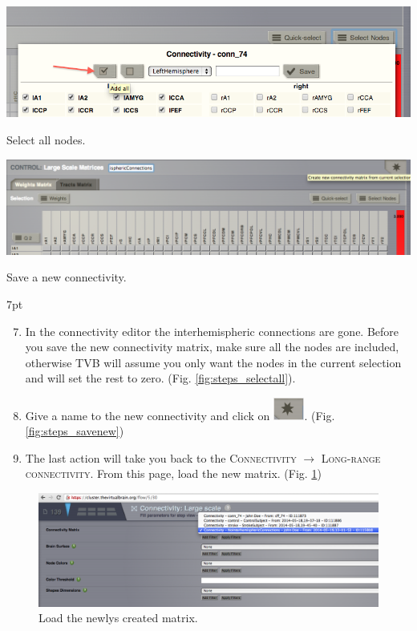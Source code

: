 \documentclass{tufte-handout}
\newenvironment{formal}{%
  \def\FrameCommand{%
    \hspace{1pt}%
    {\color{DarkBlue}\vrule width 2pt}%
    {\color{formalshade}\vrule width 4pt}%
    \colorbox{formalshade}%
  }%
  \MakeFramed{\advance\hsize-\width\FrameRestore}%
  \noindent\hspace{-4.55pt}%
  \begin{adjustwidth}{}{7pt}%
  \vspace{2pt}\vspace{2pt}%
}
{%
  \vspace{2pt}\end{adjustwidth}\endMakeFramed%
}
\begin{document}
\begin{marginfigure}%
  \includegraphics[width=\linewidth]{Handout_UI_ModellingStructuralLesions_SelectAllNodes}
    \caption{Select all nodes.}
  \label{fig:steps_selectall}
  \end{marginfigure}
  \begin{marginfigure}
 \includegraphics[width=\linewidth]{Handout_UI_ModellingStructuralLesions_SaveNewMatrix}
  \caption{Save a new connectivity.}
  \label{fig:steps_savenew}
\end{marginfigure}

\begin{formal}
  \begin{enumerate}[resume]
  \setcounter{enumi}{6}
    \item In the connectivity editor the interhemispheric connections are gone.
    Before you save the new connectivity matrix, make sure all the nodes are
included, otherwise TVB will assume you only want the nodes in the current
selection and will set the rest to zero. (Fig. \ref{fig:steps_selectall}).
   \item Give a name to the new connectivity and click on \includegraphics[width=0.08\textwidth]{butt_star_create.png}. (Fig. \ref{fig:steps_savenew})
    \item The last action will take you back to the \textsc{Connectivity} $\rightarrow$ \textsc{Long-range connectivity}. From this page, load the new matrix. (Fig. \ref{fig:steps_07})
  \end{enumerate}
\end{formal}


\begin{figure}[h]
  \includegraphics[width=\linewidth]{Handout_UI_ModellingStructuralLesions_LoadNewMatrix}%
  \caption{Load the newlys created matrix.}%
  \label{fig:steps_07}%
\end{figure}
\end{document}
